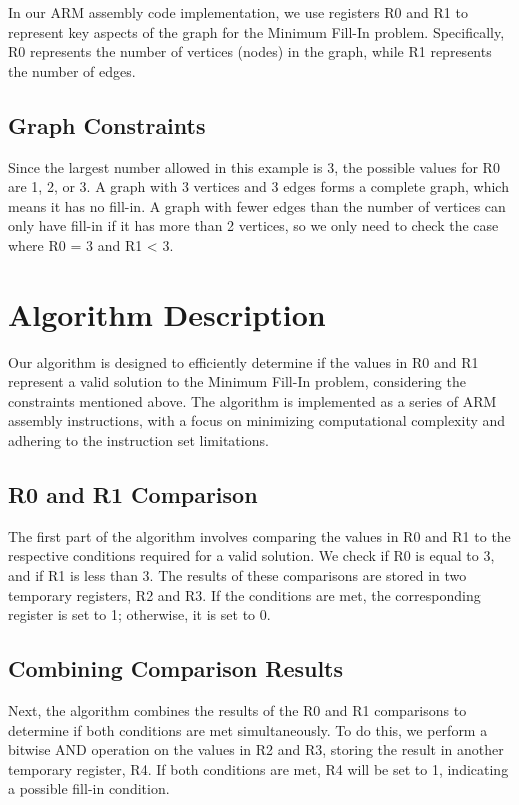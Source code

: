 In our ARM assembly code implementation, we use registers R0 and R1 to represent key aspects of the graph for the Minimum Fill-In problem. Specifically, R0 represents the number of vertices (nodes) in the graph, while R1 represents the number of edges.

\subsection{Graph Constraints}

Since the largest number allowed in this example is 3, the possible values for R0 are 1, 2, or 3. A graph with 3 vertices and 3 edges forms a complete graph, which means it has no fill-in. A graph with fewer edges than the number of vertices can only have fill-in if it has more than 2 vertices, so we only need to check the case where R0 = 3 and R1 < 3.

\section{Algorithm Description}

Our algorithm is designed to efficiently determine if the values in R0 and R1 represent a valid solution to the Minimum Fill-In problem, considering the constraints mentioned above. The algorithm is implemented as a series of ARM assembly instructions, with a focus on minimizing computational complexity and adhering to the instruction set limitations.

\subsection{R0 and R1 Comparison}

The first part of the algorithm involves comparing the values in R0 and R1 to the respective conditions required for a valid solution. We check if R0 is equal to 3, and if R1 is less than 3. The results of these comparisons are stored in two temporary registers, R2 and R3. If the conditions are met, the corresponding register is set to 1; otherwise, it is set to 0.

\subsection{Combining Comparison Results}

Next, the algorithm combines the results of the R0 and R1 comparisons to determine if both conditions are met simultaneously. To do this, we perform a bitwise AND operation on the values in R2 and R3, storing the result in another temporary register, R4. If both conditions are met, R4 will be set to 1, indicating a possible fill-in condition.

